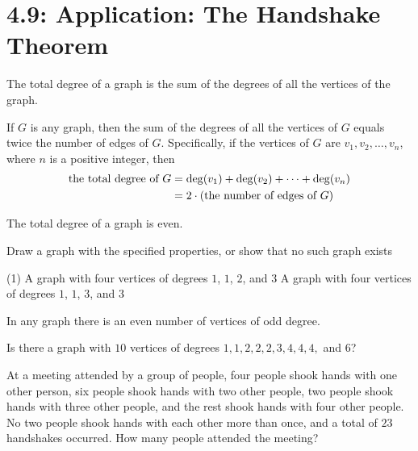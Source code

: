 \documentclass[../mathNotesPreamble]{subfiles}
\providecommand{\relscalefact}{1.4}
\begin{document}
\relscale{\relscalefact}
  \section{4.9: Application: The Handshake Theorem}

  \begin{defn*}
    The total degree of a graph is the sum of the degrees of all the vertices of the graph.  
  \end{defn*}
  
  \begin{thmBox*}
    If $G$ is any graph, then the sum of the degrees of all the vertices of $G$ equals twice the number of edges of $G$. Specifically, if the vertices of $G$ are $v_1,v_2,\dots,v_n$, where $n$ is a positive integer, then
    \begin{align*}
      \textnormal{the total degree of } G&= \operatorname{deg}(v_1)+\operatorname{deg}(v_2)+\dots+\operatorname{deg}(v_n)\\
        &=2\cdot{\left(\textnormal{the number of edges of $G$}\right)}
    \end{align*}
  \end{thmBox*}
  
  \begin{thmBox*}[Corollary 4.9.2]
    The total degree of a graph is even.
  \end{thmBox*}
  
  \begin{ex*}
    Draw a graph with the specified properties, or show that no such graph exists
    \begin{extasks}[after-item-skip=\stretch{1}](1)
      \task A graph with four vertices of degrees $1$, $1$, $2$, and $3$
      \task A graph with four vertices of degrees $1$, $1$, $3$, and $3$
    \end{extasks}
  \end{ex*}
  \pagebreak

  \begin{thmBox*}[Proposition 4.9.3]
    In any graph there is an even number of vertices of odd degree.
  \end{thmBox*}
  \begin{ex*}
    Is there a graph with $10$ vertices of degrees $1,1,2,2,2,3,4,4,4,$ and $6$?
  \end{ex*}
  \begin{ex*}
    At a meeting attended by a group of people, four people shook hands with one other person, six people shook hands with two other people, two people shook hands with three other people, and the rest shook hands with four other people. No two people shook hands with each other more than once, and a total of $23$ handshakes occurred. How many people attended the meeting?
  \end{ex*}
  \pagebreak

  \pagebreak
\end{document}
